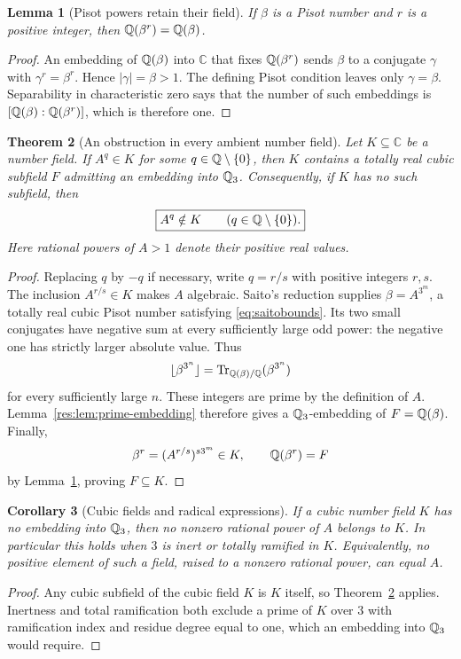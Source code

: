 \documentclass[11pt,a4paper]{article}
\newtheorem{theorem}{Theorem}[section]
\newtheorem{lemma}[theorem]{Lemma}
\newtheorem{corollary}[theorem]{Corollary}
\theoremstyle{remark}\newtheorem{remark}[theorem]{Remark}
\newcommand{\Tr}{\operatorname{Tr}}\newcommand{\Nm}{\operatorname{N}}
\begin{document}
\begin{lemma}[Pisot powers retain their field]
\label{res:lem:power-field}
If $\beta$ is a Pisot number and $r$ is a positive integer, then
$\mathbb Q(\beta^r)=\mathbb Q(\beta)$.
\end{lemma}
\begin{proof}
An embedding of $\mathbb Q(\beta)$ into $\mathbb C$ that fixes
$\mathbb Q(\beta^r)$ sends $\beta$ to a conjugate $\gamma$ with
$\gamma^r=\beta^r$. Hence $|\gamma|=\beta>1$. The defining Pisot
condition leaves only $\gamma=\beta$. Separability in characteristic
zero says that the number of such embeddings is
$[\mathbb Q(\beta):\mathbb Q(\beta^r)]$, which is therefore one.
\end{proof}

\begin{theorem}[An obstruction in every ambient number field]
\label{res:thm:ambient}
Let $K\subseteq\mathbb C$ be a number field. If $A^q\in K$ for some
$q\in\mathbb Q\setminus\{0\}$, then $K$ contains a totally real cubic
subfield $F$ admitting an embedding into $\mathbb Q_3$. Consequently, if
$K$ has no such subfield, then
\[
 \boxed{A^q\notin K\qquad(q\in\mathbb Q\setminus\{0\}).}
\]
Here rational powers of $A>1$ denote their positive real values.
\end{theorem}
\begin{proof}
Replacing $q$ by $-q$ if necessary, write $q=r/s$ with positive
integers $r,s$. The inclusion $A^{r/s}\in K$ makes $A$ algebraic.
Saito's reduction \cite[Theorem~1.7]{SaitoVariants} supplies
$\beta=A^{3^m}$, a totally real cubic Pisot number satisfying
\eqref{eq:saitobounds}. Its two small conjugates have negative sum
at every sufficiently large odd power: the negative one has strictly
larger absolute value. Thus
\[
 \lfloor\beta^{3^n}\rfloor
 =\Tr_{\Q(\beta)/\Q}(\beta^{3^n})
\]
for every sufficiently large $n$. These integers are prime by the
definition of $A$. Lemma~\ref{res:lem:prime-embedding} therefore
gives a $\mathbb Q_3$-embedding of $F=\mathbb Q(\beta)$. Finally,
\[
 \beta^r=(A^{r/s})^{s3^m}\in K,
 \qquad \mathbb Q(\beta^r)=F
\]
by Lemma~\ref{res:lem:power-field}, proving $F\subseteq K$.
\end{proof}

\begin{corollary}[Cubic fields and radical expressions]
\label{res:cor:cubic}
If a cubic number field $K$ has no embedding into $\mathbb Q_3$, then no
nonzero rational power of $A$ belongs to $K$. In particular this holds
when $3$ is inert or totally ramified in $K$. Equivalently, no positive
element of such a field, raised to a nonzero rational power, can
equal $A$.
\end{corollary}
\begin{proof}
Any cubic subfield of the cubic field $K$ is $K$ itself, so
Theorem~\ref{res:thm:ambient} applies. Inertness and total ramification
both exclude a prime of $K$ over $3$ with ramification index and
residue degree equal to one, which an embedding into $\mathbb Q_3$ would
require.
\end{proof}
\end{document}
